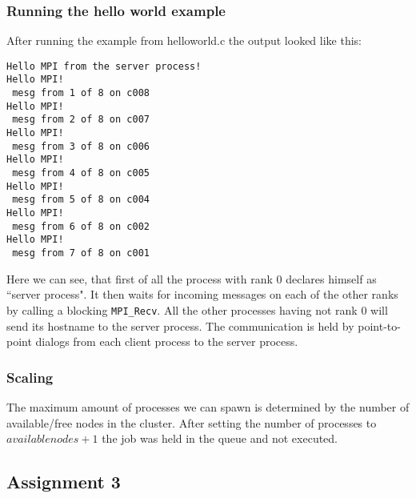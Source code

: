 	\subsubsection*{Running the hello world example}
	After running the example from helloworld.c the output looked like this:
\begin{verbatim}
Hello MPI from the server process!
Hello MPI!
 mesg from 1 of 8 on c008
Hello MPI!
 mesg from 2 of 8 on c007
Hello MPI!
 mesg from 3 of 8 on c006
Hello MPI!
 mesg from 4 of 8 on c005
Hello MPI!
 mesg from 5 of 8 on c004
Hello MPI!
 mesg from 6 of 8 on c002
Hello MPI!
 mesg from 7 of 8 on c001
\end{verbatim}
	Here we can see, that first of all the process with rank 0 declares himself as ``server process". It then waits for incoming messages on each of the other ranks by calling a blocking \texttt{MPI\_Recv}. All the other processes having not rank 0 will send its hostname to the server process. The communication is held by point-to-point dialogs from each client process to the server process.
	\subsubsection*{Scaling} 
	The maximum amount of processes we can spawn is determined by the number of available/free nodes in the cluster. After setting the number of processes to $available nodes + 1$ the job was held in the queue and not executed.


	\subsection{Assignment 3}
		
		







